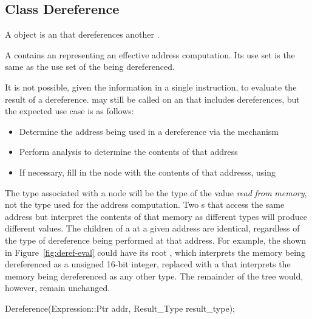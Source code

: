 \subsection{Class Dereference}
\label{sec:dereference}


A  object is an  that dereferences another
.

A  contains an  representing an effective address
computation. Its use set is the same as the use set of the  being
dereferenced.

It is not possible, given the information in a single instruction, to evaluate the
result of a dereference.  may still be called on an 
that includes dereferences, but the expected use case is as follows:

\begin{itemize}
\item Determine the address being used in a dereference via the  mechanism
\item Perform analysis to determine the contents of that address
\item If necessary, fill in the  node with the contents of that addresss, using 
\end{itemize}

The type associated with a  node will be the type of the value
{\itshape read\/} {\itshape from\/} {\itshape memory\/}, not the type used for
the address computation. Two s that access the same address but
interpret the contents of that memory as different types will produce different values.
The children of a  at a given address are identical,
regardless of the type of dereference being performed at that address. For example,
the  shown in Figure~\ref{fig:deref-eval} could have its root , which
interprets the memory being dereferenced as a unsigned 16-\/bit integer, replaced
with a  that interprets the memory being dereferenced as any
other type. The remainder of the  tree would, however, remain
unchanged.

\begin{apient}
Dereference(Expression::Ptr addr, Result_Type result_type);
\end{apient}

